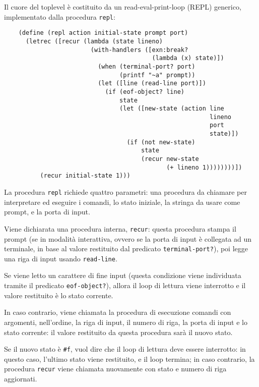 Il cuore del toplevel \`e costituito da un read-eval-print-loop (REPL)
generico, implementato dalla procedura \lstinline{repl}:

\begin{lstlisting}
    (define (repl action initial-state prompt port)
      (letrec ([recur (lambda (state lineno)
                        (with-handlers ([exn:break?
                                         (lambda (x) state)])
                          (when (terminal-port? port)
                                (printf "~a" prompt))
                          (let ([line (read-line port)])
                            (if (eof-object? line)
                                state
                                (let ([new-state (action line
                                                         lineno
                                                         port
                                                         state)])
                                  (if (not new-state)
                                      state
                                      (recur new-state
                                             (+ lineno 1))))))))])
          (recur initial-state 1)))
\end{lstlisting}

La procedura \lstinline{repl} richiede quattro parametri: una procedura
da chiamare per interpretare ed eseguire i comandi, lo stato iniziale,
la stringa da usare come prompt, e la porta di input.

Viene dichiarata una procedura interna, \lstinline{recur}: questa
procedura stampa il prompt (se in modalit\`a interattiva, ovvero se la
porta di input \`e collegata ad un terminale, in base al valore
restituito dal predicato \lstinline{terminal-port?}), poi legge una riga
di input usando \lstinline{read-line}.

Se viene letto un carattere di fine input (questa condizione viene
individuata tramite il predicato \lstinline{eof-object?}), allora il
loop di lettura viene interrotto e il valore restituito \`e lo stato
corrente.

In caso contrario, viene chiamata la procedura di esecuzione comandi
con argomenti, nell'ordine, la riga di input, il numero di riga, la
porta di input e lo stato corrente: il valore restituito da questa
procedura sar\`a il nuovo stato.

Se il nuovo stato \`e \lstinline{#f}, vuol dire che il loop di lettura
deve essere interrotto: in questo caso, l'ultimo stato viene restituito,
e il loop termina; in caso contrario, la procedura \lstinline{recur}
viene chiamata nuovamente con stato e numero di riga aggiornati.

